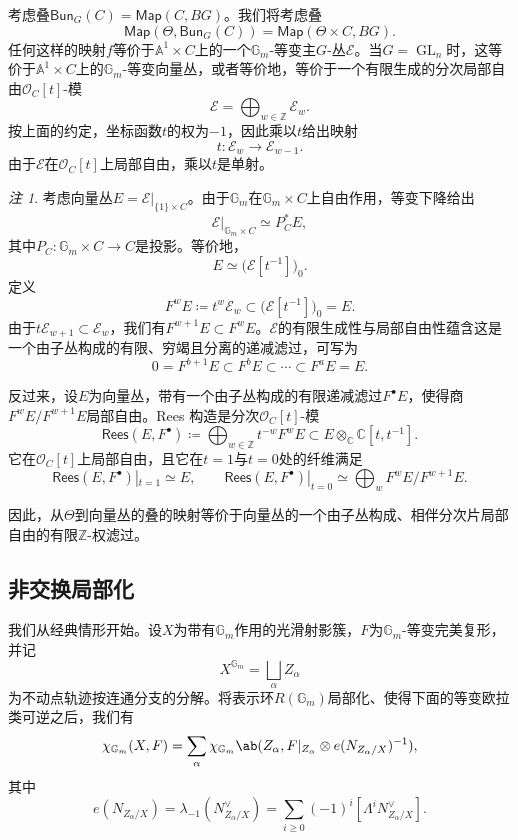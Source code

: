 \documentclass{amsart}
\theoremstyle{definition}
\theoremstyle{remark}
\newtheorem{rmk}[thm]{注}
\theoremstyle{plain}
\theoremstyle{definition}
\theoremstyle{remark}
\newcommand{\A}{\mathbb{A}}
\newcommand{\G}{\mathbb{G}}
\newcommand{\C}{\mathbb{C}}
\newcommand{\Z}{\mathbb{Z}}
\newcommand{\mc}[1]{\mathcal{#1}}
\newcommand{\on}[1]{\operatorname{#1}}
\newcommand{\ms}[1]{\mathsf{#1}}
\newcommand{\1}{\mathbf{1}}
\newcommand{\2}{\mathbf{2}}
\newcommand{\3}{\mathbf{3}}
\begin{document}
考虑叠\(\ms{Bun}_G(C) = \ms{Map}(C, BG)\)。我们将考虑叠
\[ \ms{Map}(\Theta, \ms{Bun}_G(C)) = \ms{Map}(\Theta \times C, BG). \]
任何这样的映射\(f\)等价于\(\A^1\times C\)上的一个\(\G_m\)-等变主\(G\)-丛\(\mc{E}\)。当\(G=\on{GL}_n\)时，这等价于\(\A^1\times C\)上的\(\G_m\)-等变向量丛，或者等价地，等价于一个有限生成的分次局部自由\(\mc{O}_C[t]\)-模
\[
    \mc{E}=\bigoplus_{w\in\Z}\mc{E}_w.
\]
按上面的约定，坐标函数\(t\)的权为\(-1\)，因此乘以\(t\)给出映射
\[
    t\colon\mc{E}_w\longrightarrow\mc{E}_{w-1}.
\]
由于\(\mc{E}\)在\(\mc{O}_C[t]\)上局部自由，乘以\(t\)是单射。

\begin{rmk}
    考虑向量丛\(E=\mc{E}|_{\{1\}\times C}\)。由于\(\G_m\)在\(\G_m\times C\)上自由作用，等变下降给出
    \[
        \mc{E}|_{\G_m\times C}\simeq P_C^*E,
    \]
    其中\(P_C\colon\G_m\times C\to C\)是投影。等价地，
    \[
        E\simeq\big(\mc{E}[t^{-1}]\big)_0.
    \]
    定义
    \[
        F^wE\coloneqq t^w\mc{E}_w\subset\big(\mc{E}[t^{-1}]\big)_0=E.
    \]
    由于\(t\mc{E}_{w+1}\subset\mc{E}_w\)，我们有\(F^{w+1}E\subset F^wE\)。\(\mc{E}\)的有限生成性与局部自由性蕴含这是一个由子丛构成的有限、穷竭且分离的递减滤过，可写为
    \[
        0=F^{b+1}E\subset F^bE\subset\cdots\subset F^aE=E.
    \]

    反过来，设\(E\)为向量丛，带有一个由子丛构成的有限递减滤过\(F^\bullet E\)，使得商\(F^wE/F^{w+1}E\)局部自由。Rees 构造是分次\(\mc{O}_C[t]\)-模
    \[
        \ms{Rees}(E,F^\bullet)
        \coloneqq
        \bigoplus_{w\in\Z}t^{-w}F^wE
        \subset
        E\otimes_{\C}\C[t,t^{-1}].
    \]
    它在\(\mc{O}_C[t]\)上局部自由，且它在\(t=1\)与\(t=0\)处的纤维满足
    \[
        \ms{Rees}(E,F^\bullet)|_{t=1}\simeq E,
        \qquad
        \ms{Rees}(E,F^\bullet)|_{t=0}
        \simeq
        \bigoplus_w F^wE/F^{w+1}E.
    \]
\end{rmk}

因此，从\(\Theta\)到向量丛的叠的映射等价于向量丛的一个由子丛构成、相伴分次片局部自由的有限\(\Z\)-权滤过。


\subsection{非交换局部化}%
\label{sub:Non-abelian localization}

我们从经典情形开始。设\(X\)为带有\(\G_m\)作用的光滑射影簇，\(F\)为\(\G_m\)-等变完美复形，并记
\[
    X^{\G_m}=\bigsqcup_\alpha Z_\alpha
\]
为不动点轨迹按连通分支的分解。将表示环\(R(\G_m)\)局部化、使得下面的等变欧拉类可逆之后，我们有
\[
    \chi_{\G_m}(X,F)
    =
    \sum_\alpha
    \chi_{\G_m}\ab(
        Z_\alpha,
        F|_{Z_\alpha}\otimes e(N_{Z_\alpha/X})^{-1}
    ),
\]
其中
\[
    e(N_{Z_\alpha/X})
    =
    \lambda_{-1}(N_{Z_\alpha/X}^\vee)
    =
    \sum_{i\geq0}(-1)^i[\Lambda^iN_{Z_\alpha/X}^\vee].
\]
\end{document}
